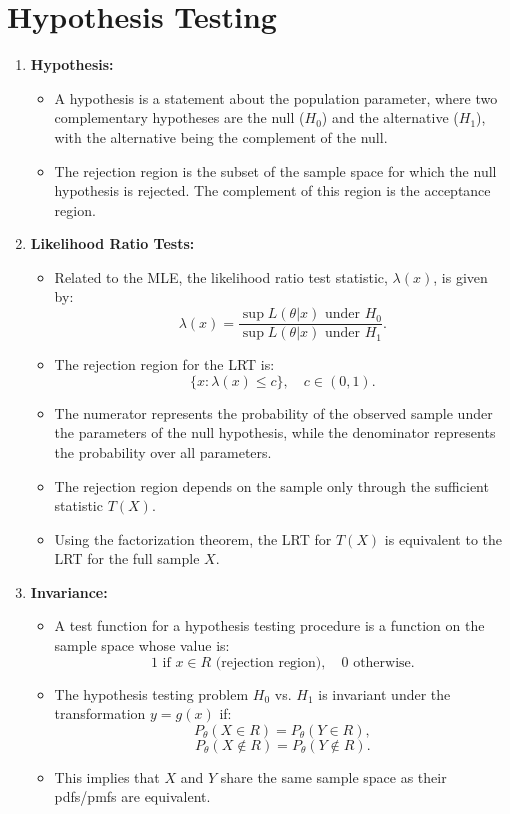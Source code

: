 \documentclass{article}
\begin{document}
\section{Hypothesis Testing}

\begin{enumerate}
    \item \textbf{Hypothesis:}
    \begin{itemize}
        \item A hypothesis is a statement about the population parameter, where two complementary hypotheses are the null (\(H_0\)) and the alternative (\(H_1\)), with the alternative being the complement of the null.
        \item The rejection region is the subset of the sample space for which the null hypothesis is rejected. The complement of this region is the acceptance region.
    \end{itemize}

    \item \textbf{Likelihood Ratio Tests:}
    \begin{itemize}
        \item Related to the MLE, the likelihood ratio test statistic, \(\lambda(x)\), is given by:
        \[
        \lambda(x) = \frac{\sup L(\theta|x) \text{ under } H_0}{\sup L(\theta|x) \text{ under } H_1}.
        \]
        \item The rejection region for the LRT is:
        \[
        \{x : \lambda(x) \leq c\}, \quad c \in (0, 1).
        \]
        \item The numerator represents the probability of the observed sample under the parameters of the null hypothesis, while the denominator represents the probability over all parameters.
        \item The rejection region depends on the sample only through the sufficient statistic \(T(X)\).
        \item Using the factorization theorem, the LRT for \(T(X)\) is equivalent to the LRT for the full sample \(X\).
    \end{itemize}

    \item \textbf{Invariance:}
    \begin{itemize}
        \item A test function for a hypothesis testing procedure is a function on the sample space whose value is:
        \[
        1 \text{ if } x \in R \text{ (rejection region)}, \quad 0 \text{ otherwise}.
        \]
        \item The hypothesis testing problem \(H_0\) vs. \(H_1\) is invariant under the transformation \(y = g(x)\) if:
        \[
        P_\theta(X \in R) = P_\theta(Y \in R),
        \]
        \[
        P_\theta(X \notin R) = P_\theta(Y \notin R).
        \]
        \item This implies that \(X\) and \(Y\) share the same sample space as their pdfs/pmfs are equivalent.
    \end{itemize}


\end{enumerate}
\end{document}
